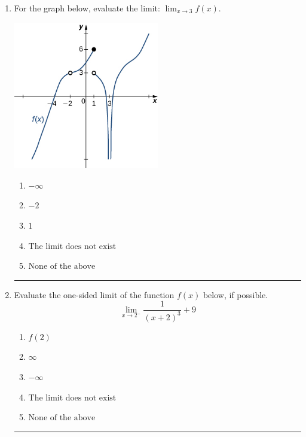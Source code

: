 \documentclass[14pt]{extbook}
\newcommand{\litem}[1]{\item#1\hspace*{-1cm}\rule{\textwidth}{0.4pt}}
\begin{document}
\begin{enumerate}
\litem{
For the graph below, evaluate the limit: $ \displaystyle \lim_{x \rightarrow 3} f(x)$.
\begin{center}
    \includegraphics[width=0.5\textwidth]{../Figures/evaluateLimitGraphicallyA.png}
\end{center}
\begin{enumerate}[label=\Alph*.]
\item \( -\infty \)
\item \( -2 \)
\item \( 1 \)
\item \( \text{The limit does not exist} \)
\item \( \text{None of the above} \)

\end{enumerate} }
\litem{
Evaluate the one-sided limit of the function $f(x)$ below, if possible.\[ \lim_{x \rightarrow 2^-} \frac{1}{(x+2)^3}+9 \]\begin{enumerate}[label=\Alph*.]
\item \( f(2) \)
\item \( \infty \)
\item \( -\infty \)
\item \( \text{The limit does not exist} \)
\item \( \text{None of the above} \)


\end{enumerate}}
\end{enumerate}
\end{document}
